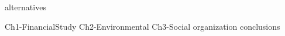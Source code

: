 {alternatives}


{Ch1-FinancialStudy}
{Ch2-Environmental}
{Ch3-Social}
{organization}
{conclusions} 





 

